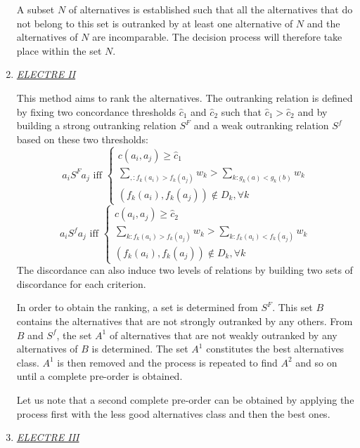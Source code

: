 \begin{enumerate}
A subset $N$ of alternatives is established such that all the alternatives that do not belong to this set is outranked by at least one alternative of $N$ and the alternatives of $N$ are incomparable. The decision process will therefore take place within the set $N$.

\item \textit{\underline{ELECTRE II}}

This method aims to rank the alternatives. The outranking relation is defined by fixing two concordance thresholds $\hat{c}_{1}$ and $\hat{c}_{2}$ such that $\hat{c}_{1} > \hat{c}_{2}$ and by building a strong outranking relation $S^{F}$ and a weak outranking relation $S^{f}$ based on these two thresholds:
\begin{equation}
a_iS^{F}a_j \text{ iff } \begin{cases}
	c(a_i, a_j) \geq \hat{c}_{1}\\
	\sum_{, : f_{k}(a_i)>f_{k}(a_j)} w_{k} > \sum_{k : g_{k}(a)<g_{k}(b)} w_{k}\\
	(f_{k}(a_i), f_{k}(a_j)) \not\in D_{k}, \forall k
	\end{cases}
\end{equation}
\begin{equation}
a_iS^{f}a_j \text{ iff } \begin{cases}
	c(a_i, a_j) \geq \hat{c}_{2}\\
	\sum_{k : f_{k}(a_i)>f_{k}(a_j)} w_{k} > \sum_{k : f_{k}(a_i)<f_{k}(a_j)} w_{k}\\
	(f_{k}(a_i), f_{k}(a_j)) \not\in D_k, \forall k
	\end{cases}
\end{equation}
The discordance can also induce two levels of relations by building two sets of discordance for each criterion.

In order to obtain the ranking, a set is determined from $S^ {F}$. This set $B$ contains the alternatives that are not strongly outranked by any others. From $B$ and $S^{f}$, the set $A^{1}$ of alternatives that are not weakly outranked by any alternatives of $B$ is determined. The set $A^{1}$ constitutes the best alternatives class. $A^{1}$ is then removed and the process is repeated to find $A^{2}$ and so on until a complete pre-order is obtained.

Let us note that a second complete pre-order can be obtained by applying the process first with the less good alternatives class and then the best ones.

\item \textit{\underline{ELECTRE III}}


\end{enumerate}
